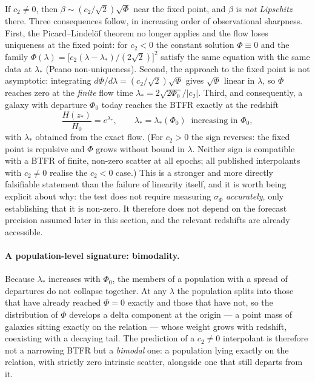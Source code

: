 \documentclass[11pt]{article}
\theoremstyle{plain}
\begin{document}
If $c_{2}\neq0$, then $\beta\sim(c_{2}/\sqrt{2})\sqrt{\Phi}$ near the fixed
point, and $\beta$ is \emph{not Lipschitz} there. Three consequences follow,
in increasing order of observational sharpness. First, the Picard--Lindel\"of
theorem no longer applies and the flow loses uniqueness at the fixed point: for
$c_{2}<0$ the constant solution $\Phi\equiv0$ and the family
$\Phi(\lambda)=\bigl[c_{2}(\lambda-\lambda_{*})/(2\sqrt2)\bigr]^{2}$ satisfy the
same equation with the same data at $\lambda_{*}$ (Peano non-uniqueness).
Second, the approach to the fixed point is not asymptotic: integrating
$d\Phi/d\lambda=(c_{2}/\sqrt2)\sqrt{\Phi}$ gives $\sqrt{\Phi}$ linear in
$\lambda$, so $\Phi$ reaches zero at the \emph{finite} flow time
$\lambda_{*}=2\sqrt{2\Phi_{0}}/|c_{2}|$. Third, and consequently, a galaxy with
departure $\Phi_{0}$ today reaches the BTFR exactly at the redshift
\begin{equation*}\tag{15}\label{eq:zstar}
\frac{H(z_{*})}{H_{0}}=e^{\lambda_{*}},
\qquad
\lambda_{*}=\lambda_{*}(\Phi_{0}) \ \text{ increasing in } \Phi_{0},
\end{equation*}
with $\lambda_{*}$ obtained from the exact flow. (For $c_{2}>0$ the sign
reverses: the fixed point is repulsive and $\Phi$ grows without bound in
$\lambda$. Neither sign is compatible with a BTFR of finite, non-zero scatter
at all epochs; all published interpolants with $c_{2}\neq0$ realise the
$c_{2}<0$ case.) This is a stronger and more
directly falsifiable statement than the failure of linearity itself, and it is
worth being explicit about why: the test does not require measuring
$\sigma_{\Phi}$ \emph{accurately}, only establishing that it is non-zero. It
therefore does not depend on the forecast precision assumed later in this
section, and the relevant redshifts are already accessible.

\paragraph{A population-level signature: bimodality.} Because $\lambda_{*}$
increases with $\Phi_{0}$, the members of a population with a spread of
departures do not collapse together. At any $\lambda$ the population splits
into those that have already reached $\Phi=0$ exactly and those that have not,
so the distribution of $\Phi$ develops a delta component at the origin --- a
point mass of galaxies sitting exactly on the relation --- whose weight grows
with redshift, coexisting with a decaying tail. The prediction of a $c_{2}\neq0$
interpolant is therefore not a narrowing BTFR but a \emph{bimodal} one: a
population lying exactly on the relation, with strictly zero intrinsic scatter,
alongside one that still departs from it.
\end{document}
